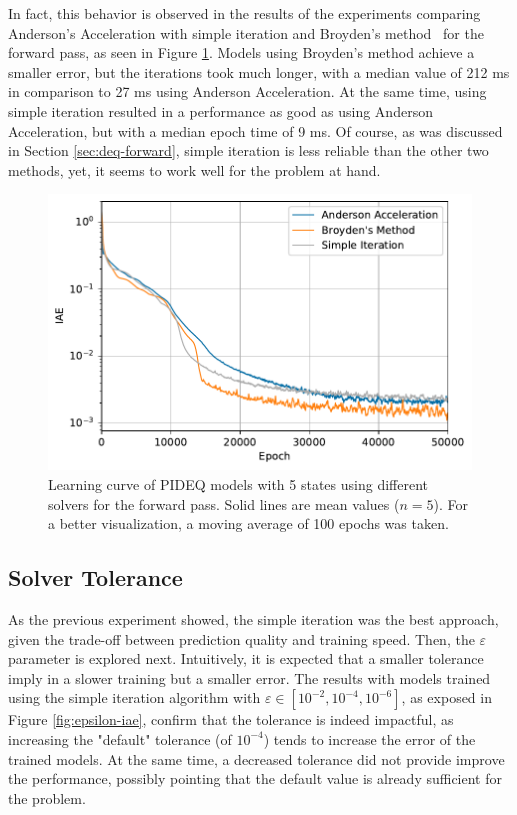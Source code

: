 In fact, this behavior is observed in the results of the experiments comparing Anderson's Acceleration with simple iteration and Broyden's method~\cite{broyden_class_1965} for the forward pass, as seen in Figure \ref{fig:solver-iae}.
Models using Broyden's method achieve a smaller error, but the iterations took much longer, with a median value of 212 ms in comparison to 27 ms using Anderson Acceleration.
At the same time, using simple iteration resulted in a performance as good as using Anderson Acceleration, but with a median epoch time of 9 ms.
Of course, as was discussed in Section \ref{sec:deq-forward}, simple iteration is less reliable than the other two methods, yet, it seems to work well for the problem at hand.

\begin{figure}[h]
    \centering
    \includegraphics{images/exp_5_iae.pdf}
    \caption{Learning curve of \gls{PIDEQ} models with 5 states using different solvers for the forward pass. Solid lines are mean values ($n=5$). For a better visualization, a moving average of 100 epochs was taken.}
    \label{fig:solver-iae}
\end{figure}

\subsection{Solver Tolerance}

As the previous experiment showed, the simple iteration was the best approach, given the trade-off between prediction quality and training speed.
Then, the $\varepsilon$ parameter is explored next.
Intuitively, it is expected that a smaller tolerance imply in a slower training but a smaller error.
The results with models trained using the simple iteration algorithm with $\varepsilon \in \left[ 10^{-2}, 10^{-4},10^{-6} \right] $, as exposed in Figure \ref{fig:epsilon-iae}, confirm that the tolerance is indeed impactful, as increasing the "default" tolerance (of $10^{-4}$) tends to increase the error of the trained models.
At the same time, a decreased tolerance did not provide improve the performance, possibly pointing that the default value is already sufficient for the problem.


